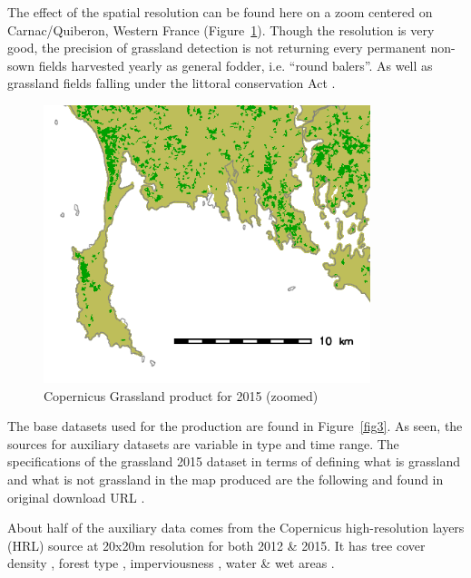 \documentclass[a4paper,11.5pt,onecolumn]{article}
\begin{document}
\noindent The effect of the spatial resolution can be found here on a zoom centered on Carnac/Quiberon, Western France (Figure~\ref{fig2}). Though the resolution is very good, the precision of grassland detection is not returning every permanent non-sown fields harvested yearly as general fodder, i.e. ``round balers''. As well as grassland fields falling under the littoral conservation Act \citep{france1986}.

\begin{figure}[htbp]
\includegraphics[width=0.85\textwidth]{images/grassland2015_zoom.png}
\caption{Copernicus Grassland product for 2015 (zoomed)}
\label{fig2}
\end{figure}

\noindent The base datasets used for the production are found in Figure~\ref{fig3}. As seen, the sources for auxiliary datasets are variable in type and time range. The specifications of the grassland 2015 dataset in terms of defining what is grassland and what is not grassland in the map produced are the following and found in original download URL \citep{grasslandreport2018}.\newline\linebreak

\noindent About half of the auxiliary data comes from the Copernicus high-resolution layers (HRL) source at 20x20m resolution for both 2012 \& 2015. It has tree cover density \citep{tcdreport2018}, forest type \citep{ftyreport2018}, imperviousness \citep{impreport2018}, water \& wet areas \citep{wwareport2018}.\newline\linebreak
\end{document}
